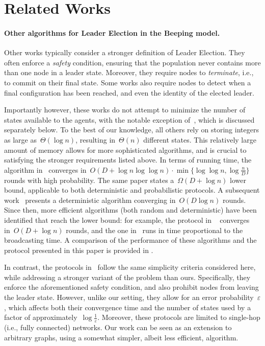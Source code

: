 \section{Related Works}
\label{sec:related_works}


\paragraph{Other algorithms for Leader Election in the Beeping model.}

Other works typically consider
a stronger definition of Leader Election. They often enforce a {\em safety} condition, ensuring that the population never contains more than one node in a leader state. Moreover, they require nodes to {\em terminate}, i.e., to commit on their final state. Some works also require nodes to detect when a final configuration has been reached, and even the identity of the elected leader.

Importantly however, these works do not attempt to minimize the number of states available to the agents, with the notable exception of~\cite{gilbert_computational_2015}, which is discussed separately below. To the best of our knowledge, all others rely on storing integers as large as~$\Theta(\log n)$, resulting in~$\Theta(n)$ different states. This relatively large amount of memory allows for more sophisticated algorithms, and is crucial to satisfying the stronger requirements listed above.
In terms of running time, the algorithm in~\cite{GhaffariH13} converges in~$O(D + \log n \log \log n) \cdot \min \{ \log \log n, \log \frac{n}{D} \}$ rounds with high probability.
The same paper states a~$\Omega(D + \log n)$ lower bound, applicable to both deterministic and probabilistic protocols.
A subsequent work~\cite{ForsterSW14} presents a deterministic algorithm converging in~$O(D \log n)$ rounds.
Since then, more efficient algorithms (both random and deterministic) have been identified that reach the lower bound: for example, the protocol in ~\cite{DufoulonBB18} converges in~$O(D + \log n)$ rounds, and the one in~\cite{CzumajD19} runs in time proportional to the broadcasting time. A comparison of the performance of these algorithms and the protocol presented in this paper is provided in .

In contrast, the protocols in~\cite{gilbert_computational_2015} follow the same simplicity criteria considered here, while addressing a stronger variant of the problem than ours. Specifically, they enforce the aforementioned safety condition, and also prohibit nodes from leaving the leader state. However, unlike our setting, they allow for an error probability~$\varepsilon$, which affects both their convergence time and the number of states used by a factor of approximately~$\log \frac{1}{\varepsilon}$. Moreover, these protocols are limited to single-hop (i.e., fully connected) networks.
Our work can be seen as an extension to arbitrary graphs, using a somewhat simpler, albeit less efficient, algorithm.

